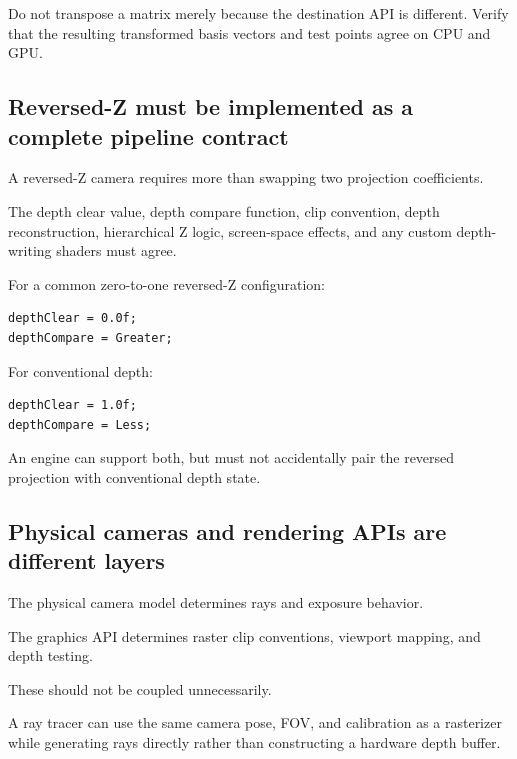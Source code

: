 Do not transpose a matrix merely because the destination API is different. Verify that the resulting transformed basis vectors and test points agree on CPU and GPU.

\subsection{Reversed-Z must be implemented as a complete pipeline contract}\label{02-foundations-ii-ch037-reversed-z-must-be-implemented-as-a-complete-pipeline-contract}

\hypertarget{02-foundations-ii-ch037-reversed-z-must-be-implemented-as-a-complete-pipeline-contract}{}

A reversed-Z camera requires more than swapping two projection coefficients.

The depth clear value, depth compare function, clip convention, depth reconstruction, hierarchical Z logic, screen-space effects, and any custom depth-writing shaders must agree.

For a common zero-to-one reversed-Z configuration:

\begin{verbatim}
depthClear = 0.0f;
depthCompare = Greater;
\end{verbatim}

For conventional depth:

\begin{verbatim}
depthClear = 1.0f;
depthCompare = Less;
\end{verbatim}

An engine can support both, but must not accidentally pair the reversed projection with conventional depth state.

\subsection{Physical cameras and rendering APIs are different layers}\label{02-foundations-ii-ch037-physical-cameras-and-rendering-apis-are-different-layers}

\hypertarget{02-foundations-ii-ch037-physical-cameras-and-rendering-apis-are-different-layers}{}

The physical camera model determines rays and exposure behavior.

The graphics API determines raster clip conventions, viewport mapping, and depth testing.

These should not be coupled unnecessarily.

A ray tracer can use the same camera pose, FOV, and calibration as a rasterizer while generating rays directly rather than constructing a hardware depth buffer.

